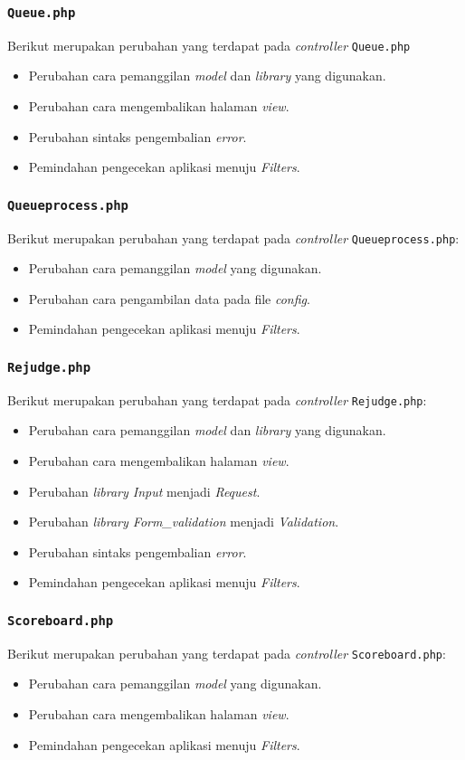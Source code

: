 \subsubsection{\texttt{Queue.php}}
Berikut merupakan perubahan yang terdapat pada \textit{controller} \texttt{Queue.php}
\begin{itemize}
	\item Perubahan cara pemanggilan \textit{model} dan \textit{library} yang digunakan.
	\item Perubahan cara mengembalikan halaman \textit{view}.
	\item Perubahan sintaks pengembalian \textit{error}.
	\item Pemindahan pengecekan aplikasi menuju \textit{Filters}.
\end{itemize}
\subsubsection{\texttt{Queueprocess.php}}
Berikut merupakan perubahan yang terdapat pada \textit{controller} \texttt{Queueprocess.php}:
\begin{itemize}
	\item Perubahan cara pemanggilan \textit{model} yang digunakan.
	\item Perubahan cara pengambilan data pada file \textit{config}.
	\item Pemindahan pengecekan aplikasi menuju \textit{Filters}.
\end{itemize}
\subsubsection{\texttt{Rejudge.php}}
Berikut merupakan perubahan yang terdapat pada \textit{controller} \texttt{Rejudge.php}:
\begin{itemize}
	\item Perubahan cara pemanggilan \textit{model} dan \textit{library} yang digunakan.
	\item Perubahan cara mengembalikan halaman \textit{view}.
	\item Perubahan \textit{library Input} menjadi \textit{Request}.
	\item Perubahan \textit{library Form\_validation} menjadi \textit{Validation}.
	\item Perubahan sintaks pengembalian \textit{error}.
	\item Pemindahan pengecekan aplikasi menuju \textit{Filters}.
\end{itemize}
\subsubsection{\texttt{Scoreboard.php}}
Berikut merupakan perubahan yang terdapat pada \textit{controller} \texttt{Scoreboard.php}:
\begin{itemize}
	\item Perubahan cara pemanggilan \textit{model} yang digunakan.
	\item Perubahan cara mengembalikan halaman \textit{view}.
	\item Pemindahan pengecekan aplikasi menuju \textit{Filters}.
\end{itemize}
